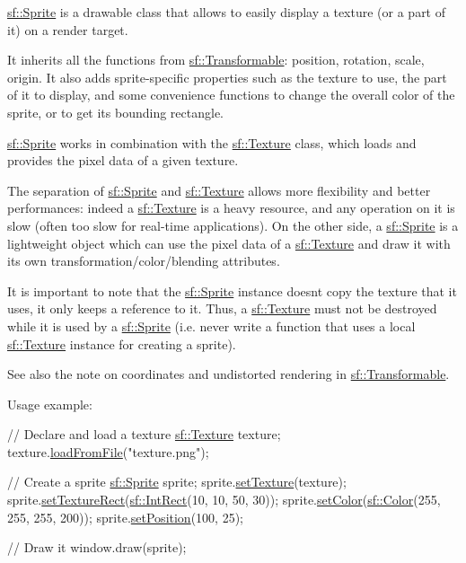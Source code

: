 \hyperlink{classsf_1_1_sprite}{sf\+::\+Sprite} is a drawable class that allows to easily display a texture (or a part of it) on a render target.

It inherits all the functions from \hyperlink{classsf_1_1_transformable}{sf\+::\+Transformable}\+: position, rotation, scale, origin. It also adds sprite-\/specific properties such as the texture to use, the part of it to display, and some convenience functions to change the overall color of the sprite, or to get its bounding rectangle.

\hyperlink{classsf_1_1_sprite}{sf\+::\+Sprite} works in combination with the \hyperlink{classsf_1_1_texture}{sf\+::\+Texture} class, which loads and provides the pixel data of a given texture.

The separation of \hyperlink{classsf_1_1_sprite}{sf\+::\+Sprite} and \hyperlink{classsf_1_1_texture}{sf\+::\+Texture} allows more flexibility and better performances\+: indeed a \hyperlink{classsf_1_1_texture}{sf\+::\+Texture} is a heavy resource, and any operation on it is slow (often too slow for real-\/time applications). On the other side, a \hyperlink{classsf_1_1_sprite}{sf\+::\+Sprite} is a lightweight object which can use the pixel data of a \hyperlink{classsf_1_1_texture}{sf\+::\+Texture} and draw it with its own transformation/color/blending attributes.

It is important to note that the \hyperlink{classsf_1_1_sprite}{sf\+::\+Sprite} instance doesn\textquotesingle{}t copy the texture that it uses, it only keeps a reference to it. Thus, a \hyperlink{classsf_1_1_texture}{sf\+::\+Texture} must not be destroyed while it is used by a \hyperlink{classsf_1_1_sprite}{sf\+::\+Sprite} (i.\+e. never write a function that uses a local \hyperlink{classsf_1_1_texture}{sf\+::\+Texture} instance for creating a sprite).

See also the note on coordinates and undistorted rendering in \hyperlink{classsf_1_1_transformable}{sf\+::\+Transformable}.

Usage example\+: 
\begin{DoxyCode}
\textcolor{comment}{// Declare and load a texture}
\hyperlink{classsf_1_1_texture}{sf::Texture} texture;
texture.\hyperlink{classsf_1_1_texture_a8e1b56eabfe33e2e0e1cb03712c7fcc7}{loadFromFile}(\textcolor{stringliteral}{"texture.png"});

\textcolor{comment}{// Create a sprite}
\hyperlink{classsf_1_1_sprite}{sf::Sprite} sprite;
sprite.\hyperlink{classsf_1_1_sprite_a3729c88d88ac38c19317c18e87242560}{setTexture}(texture);
sprite.\hyperlink{classsf_1_1_sprite_a3fefec419a4e6a90c0fd54c793d82ec2}{setTextureRect}(\hyperlink{classsf_1_1_rect}{sf::IntRect}(10, 10, 50, 30));
sprite.\hyperlink{classsf_1_1_sprite_a14def44da6437bfea20c4df5e71aba4c}{setColor}(\hyperlink{classsf_1_1_color}{sf::Color}(255, 255, 255, 200));
sprite.\hyperlink{classsf_1_1_transformable_a4dbfb1a7c80688b0b4c477d706550208}{setPosition}(100, 25);

\textcolor{comment}{// Draw it}
window.draw(sprite);
\end{DoxyCode}



